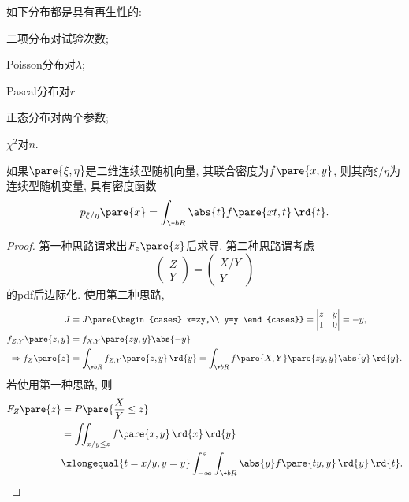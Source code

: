 \documentclass[../Statistics.tex]{subfiles}
\begin{document}
如下分布都是具有再生性的:
\begin{cenum}
    \item 二项分布对试验次数;
    \item Poisson分布对$\lambda$;
    \item Pascal分布对$r$
    \item 正态分布对两个参数;
    \item $\chi^2$对$n$.
\end{cenum}
\begin{theorem}
    如果$\pare{\xi,\eta}$是二维连续型随机向量, 其联合密度为$f\pare{x,y}$, 则其商$\xi/\eta$为连续型随机变量, 具有密度函数
    \[ p_{\xi/\eta}\pare{x} = \int_{\+bR} \abs{t}f\pare{xt,t}\,\rd{t}. \]
\end{theorem}
\begin{proof}
    第一种思路谓求出$F_z\pare{z}$后求导. 第二种思路谓考虑
    \[ \begin{pmatrix}
        Z\\
        Y
    \end{pmatrix} = \begin{pmatrix}
        X/Y\\
        Y
    \end{pmatrix} \]
    的pdf后边际化. 使用第二种思路,
    \begin{align*}
        J &= J\pare{\begin{cases}
            x=zy,\\
            y=y
        \end{cases}} = \begin{vmatrix}
            z & y \\
            1 & 0
        \end{vmatrix} = -y,\\
        f_{Z,Y}\pare{z,y} &= f_{X,Y}\pare{zy,y}\abs{-y} \\
        \Rightarrow f_Z\pare{z} &= \int_{\+bR} f_{Z,Y}\pare{z,y}\,\rd{y} = \int_{\+bR} f\pare{X,Y}\pare{zy,y}\abs{y}\,\rd{y}.
    \end{align*}
    若使用第一种思路, 则
    \begin{align*}
        F_Z\pare{z} &= P\pare{\frac{X}{Y}\le z} \\
        &= \iint_{x/y \le z} f\pare{x,y}\,\rd{x}\,\rd{y} \\
        &\xlongequal{t=x/y,y=y} \int_{-\infty}^z \int_{\+bR}\abs{y}f\pare{ty,y}\,\rd{y}\,\rd{t}.
    \end{align*}
\end{proof}
\end{document}
